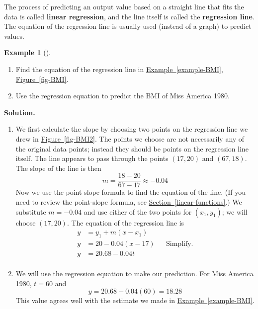 \documentclass[10pt,]{book}
\newcommand{\terminology}[1]{\textbf{#1}}
\theoremstyle{plain}
\theoremstyle{definition}
\theoremstyle{definition}
\theoremstyle{definition}
\newtheorem{example}[theorem]{Example}
\theoremstyle{definition}
\theoremstyle{definition}
\numberwithin{equation}{section}
\newcommand{\amp}{ & }
\begin{document}
    The process of predicting an output value based on a straight line that fits the data is called \terminology{linear regression}, and the line itself is called the \terminology{regression line}. The equation of the regression line is usually used (instead of a graph) to predict values.%
\begin{example}[]\label{example-BMI-regression}
\leavevmode%
\begin{enumerate}[label=*\alph**]
\item\hypertarget{li-199}{}Find the equation of the regression line in \hyperref[example-BMI]{Example~\ref{example-BMI}}, \hyperref[fig-BMI]{Figure~\ref{fig-BMI}}.\item\hypertarget{li-200}{}Use the regression equation to predict the BMI of Miss America 1980.\end{enumerate}
\par\medskip\noindent%
\textbf{Solution.}\quad \leavevmode%
\begin{enumerate}[label=*\alph**]
\item\hypertarget{li-201}{}We first calculate the slope by choosing two points on the regression line we drew in \hyperref[fig-BMI2]{Figure~\ref{fig-BMI2}}. The points we choose are not necessarily any of the original data points; instead they should be points on the regression line itself. The line appears to pass through the points \((17, 20)\) and \((67, 18)\). The slope of the line is then
        \begin{equation*}m = \frac{18 − 20}{67 − 17}\approx −0.04\end{equation*}
        Now we use the point-slope formula to find the equation of the line. (If you need to review the point-slope formula, see \hyperref[linear-functions]{Section~\ref{linear-functions}}.) We substitute \(m = −0.04\) and use either of the two points for \((x_1, y_1)\); we will choose \((17, 20)\). The equation of the regression line is
        \begin{align*}
        y \amp = y_1 + m(x − x_1)\\
        y \amp = 20−0.04(x−17)
        \amp \amp \text{Simplify.}\\
        y \amp = 20.68 − 0.04t\\
        \end{align*}
        \item\hypertarget{li-202}{}We will use the regression equation to make our prediction. For Miss America 1980, \(t = 60\) and 
        \begin{equation*}y = 20.68 − 0.04(60) = 18.28\end{equation*}
        This value agrees well with the estimate we made in \hyperref[example-BMI]{Example~\ref{example-BMI}}.\end{enumerate}
\end{example}
\end{document}

